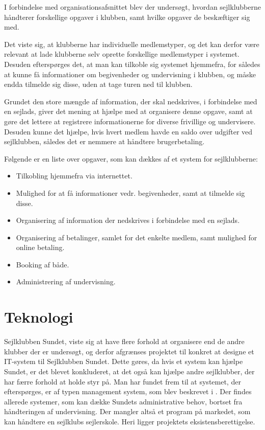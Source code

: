 I forbindelse med organisationsafsnittet blev der undersøgt, hvordan sejlklubberne håndterer forskellige opgaver i klubben, samt hvilke opgaver de beskæftiger sig med.

Det viste sig, at klubberne har individuelle medlemstyper, og det kan derfor være relevant at lade klubberne selv oprette forskellige medlemstyper i systemet. 
Desuden efterspørges det, at man kan tilkoble sig systemet hjemmefra, for således at kunne få informationer om begivenheder og undervisning i klubben, og måske endda tilmelde sig disse, uden at tage turen ned til klubben.

Grundet den store mængde af information, der skal nedskrives, i forbindelse med en sejlads, giver det mening at hjælpe med at organisere denne opgave, samt at gøre det lettere at registrere informationerne for diverse frivillige og undervisere. 
Desuden kunne det hjælpe, hvis hvert medlem havde en saldo over udgifter ved sejlklubben, således det er nemmere at håndtere brugerbetaling.

Følgende er en liste over opgaver, som kan dækkes af et system for sejlklubberne:

\begin{itemize}
  \item Tilkobling hjemmefra via internettet.
  \item Mulighed for at få informationer vedr. begivenheder, samt at tilmelde sig disse.
  \item Organisering af information der nedskrives i forbindelse med en sejlads.
  \item Organisering af betalinger, samlet for det enkelte medlem, samt mulighed for online betaling.
  \item Booking af både.
  \item Administrering af undervisning.
\end{itemize}


\section{Teknologi}

Sejlklubben Sundet, viste sig at have flere forhold at organisere end de andre klubber der er undersøgt, og derfor afgrænses projektet til konkret at designe et IT-system til Sejlklubben Sundet. 
Dette gøres, da hvis et system kan hjælpe Sundet, er det blevet konkluderet, at det også kan hjælpe andre sejlklubber, der har færre forhold at holde styr på.
Man har fundet frem til at systemet, der efterspørges, er af typen management system, som blev beskrevet i .
Der findes allerede systemer, som kan dække Sundets administrative behov, bortset fra håndteringen af undervisning.
Der mangler altså et program på markedet, som kan håndtere en sejlklubs sejlerskole.
Heri ligger projektets eksistensberettigelse.

